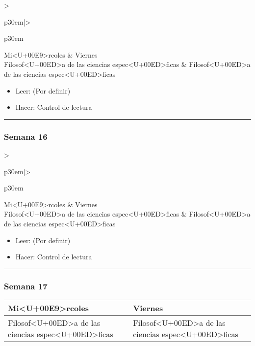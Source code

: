 \documentclass[spanish,]{article}
\begin{document}
\begin{tabular}{>{\raggedright\arraybackslash}p{30em}|>{\raggedright\arraybackslash}p{30em}}
\hline
Mi<U+00E9>rcoles & Viernes\\
\hline
Filosof<U+00ED>a de las ciencias espec<U+00ED>ficas & Filosof<U+00ED>a de las ciencias espec<U+00ED>ficas\\
\hline
\end{tabular}

\begin{itemize}
\item
  Leer: (Por definir)
\item
  Hacer: Control de lectura
\end{itemize}

\begin{center}\rule{0.5\linewidth}{\linethickness}\end{center}

\subsubsection{Semana 16}\label{semana-16}

\begin{tabular}{>{\raggedright\arraybackslash}p{30em}|>{\raggedright\arraybackslash}p{30em}}
\hline
Mi<U+00E9>rcoles & Viernes\\
\hline
Filosof<U+00ED>a de las ciencias espec<U+00ED>ficas & Filosof<U+00ED>a de las ciencias espec<U+00ED>ficas\\
\hline
\end{tabular}

\begin{itemize}
\item
  Leer: (Por definir)
\item
  Hacer: Control de lectura
\end{itemize}

\begin{center}\rule{0.5\linewidth}{\linethickness}\end{center}

\subsubsection{Semana 17}\label{semana-17}

\begin{tabular}{>{\raggedright\arraybackslash}p{30em}|>{\raggedright\arraybackslash}p{30em}}
\hline
Mi<U+00E9>rcoles & Viernes\\
\hline
Filosof<U+00ED>a de las ciencias espec<U+00ED>ficas & Filosof<U+00ED>a de las ciencias espec<U+00ED>ficas\\
\hline
\end{tabular}
\end{document}

